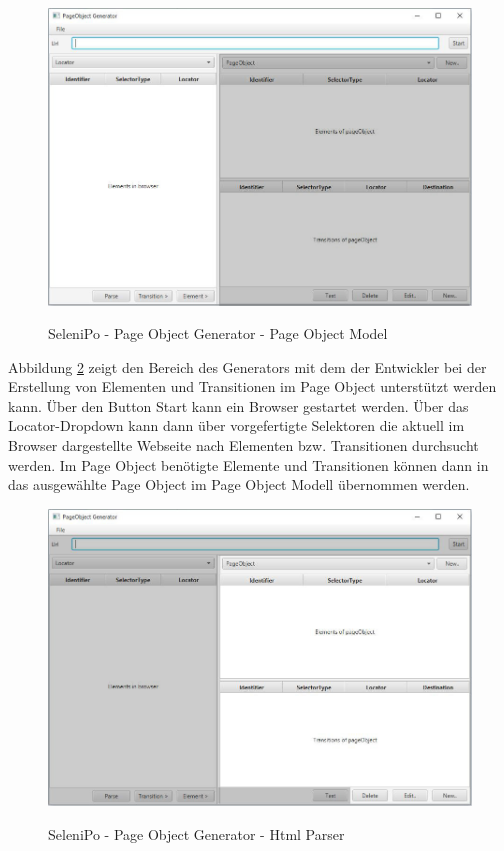 \begin{figure}[htb]
  \centering  
  \includegraphics[scale=0.5]{img/poGeneratorPo.JPG}\\
  \caption{SeleniPo - Page Object Generator - Page Object Model}
  \label{fig:poGeneratorPo}
\end{figure}

\newpage

Abbildung \ref{fig:poGeneratorHtml} zeigt den Bereich des Generators mit dem der Entwickler bei der Erstellung von Elementen und Transitionen im Page Object unterstützt werden kann.
Über den Button Start kann ein Browser gestartet werden. Über das Locator-Dropdown kann dann über vorgefertigte Selektoren die aktuell im Browser dargestellte Webseite nach Elementen bzw. Transitionen durchsucht werden. Im Page Object benötigte Elemente und Transitionen können dann in das ausgewählte Page Object im Page Object Modell übernommen werden.

\begin{figure}[htb]
  \centering  
  \includegraphics[scale=0.5]{img/poGeneratorHtml.JPG}\\
  \caption{SeleniPo - Page Object Generator - Html Parser}
  \label{fig:poGeneratorHtml}
\end{figure}

